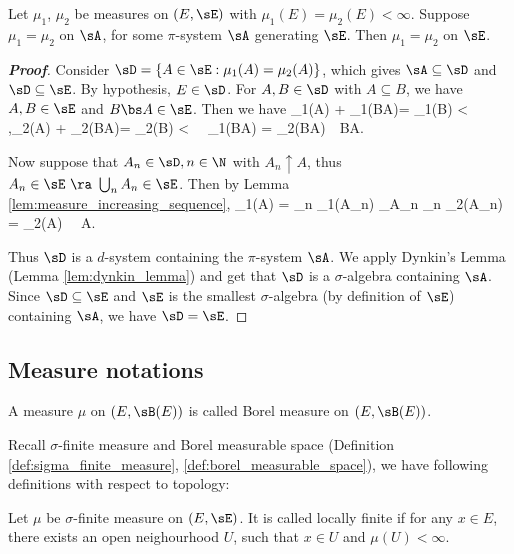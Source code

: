 \begin{theorem}\label{thm:uniqueness_of_extension_measure}
Let $\mu_1$, $\mu_2$ be measures on $(E,\sE)$ with $\mu_1(E)=\mu_2(E)<\infty$. Suppose $\mu_1=\mu_2$ on $\sA$, for some $\pi$-system $\sA$ generating $\sE$. Then $\mu_1=\mu_2$ on $\sE$.
\end{theorem}

\begin{proof}[\bf Proof]
Consider $\sD = \{A\in\sE:\mu_1(A) = \mu_2(A)\}$, which gives $\sA \subseteq \sD$ and $\sD\subseteq \sE$. By hypothesis, $E\in \sD$. For $A,B\in\sD$ with $A\subseteq B$, we have $A,B\in \sE$ and $B\bs A\in \sE$. Then we have
\be
\mu_1(A) + \mu_1(B\bs A)= \mu_1(B) < \infty,\quad \mu_2(A) + \mu_2(B\bs A)= \mu_2(B) < \infty \ \ra \ \mu_1(B\bs A) = \mu_2(B\bs A)\ \ra \ B\bs A\in\sD.
\ee

Now suppose that $A_n\in \sD, n\in\N$ with $A_n \uparrow A$, thus $A_n \in\sE \ \ra \ \bigcup_n A_n \in \sE$. Then by Lemma \ref{lem:measure_increasing_sequence},
\be
\mu_1(A) = \lim_n \mu_1(A_n) \underbrace{=}_{A_n \in \sD} \lim_n \mu_2(A_n) = \mu_2(A) \ \ra \ A\in \sD.
\ee

Thus $\sD$ is a $d$-system containing the $\pi$-system $\sA$. We apply Dynkin's Lemma (Lemma \ref{lem:dynkin_lemma}) and get that $\sD$ is a $\sigma$-algebra containing $\sA$. Since $\sD \subseteq \sE$ and $\sE$ is the smallest $\sigma$-algebra (by definition of $\sE$) containing $\sA$, we have $\sD = \sE$.
\end{proof}


\subsection{Measure notations}

\begin{definition}\label{def:borel_measure}
A measure $\mu$ on $(E,\sB(E))$ is called Borel measure on $(E,\sB(E))$.
\end{definition}

Recall $\sigma$-finite measure and Borel measurable space (Definition \ref{def:sigma_finite_measure}, \ref{def:borel_measurable_space}), we have following definitions with respect to topology:

\begin{definition}\label{def:locally_finite_measure}
Let $\mu$ be $\sigma$-finite measure on $(E,\sE)$. It is called locally finite if for any $x\in E$, there exists an open neighourhood $U$, such that $x\in U$ and $\mu(U) < \infty$.
\end{definition}

